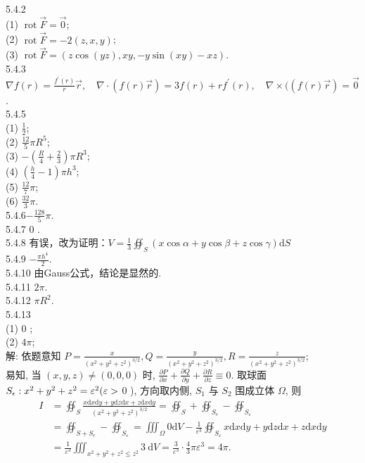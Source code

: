 \documentclass[a4paper,11pt,UTF8]{article}
\begin{document}
5.4.2\\
(1) $\operatorname{rot} \vec{F}=\overrightarrow{0}$;\\
(2) $\operatorname{rot} \vec{F}=-2(z, x, y)$;\\
(3) $\operatorname{rot} \vec{F}=(z \cos (y z), x y,-y \sin (x y)-x z)$.\\
5.4.3 $\nabla f(r)=\frac{f^{\prime}(r)}{r} \vec{r}, \quad \nabla \cdot(f(r) \vec{r})=3 f(r)+r f^{\prime}(r), \quad \nabla \times((f(r) \vec{r})=\overrightarrow{0}$.\\
5.4.5\\
(1) $\frac{1}{2}$;\\
(2) $\frac{12}{5} \pi R^5$;\\
(3) $-\left(\frac{R}{4}+\frac{2}{3}\right) \pi R^3$;\\
(4) $\left(\frac{h}{4}-1\right) \pi h^3$;\\
(5) $\frac{12}{7} \pi$;\\
(6) $\frac{32}{3} \pi$.\\
5.4.6$-\frac{128}{5} \pi$.\\
5.4.7 0 .\\
5.4.8 有误，改为证明：$V = \frac{1}{3}\oiint_S(x\cos \alpha+y \cos \beta+ z \cos \gamma)\mathrm{d}S$\\
5.4.9 $-\frac{\pi h^4}{2}$.\\
5.4.10 由Gauss公式，结论是显然的.\\
5.4.11 $ 2\pi$.\\
5.4.12 $ \pi R^2$.\\
5.4.13\\
(1) 0 ;\\
(2) $4 \pi$;\\
解: 依题意知 $P=\frac{x}{\left(x^2+y^2+z^2\right)^{3 / 2}}, Q=\frac{y}{\left(x^2+y^2+z^2\right)^{3 / 2}}, R=\frac{z}{\left(x^2+y^2+z^2\right)^{3 / 2}}$;\\
 易知, 当 $(x, y, z) \neq(0,0,0)$ 时, $\frac{\partial P}{\partial x}+\frac{\partial Q}{\partial y}+\frac{\partial R}{\partial z} \equiv 0$. 取球面 $S_\epsilon:\\ x^2+y^2+z^2=\varepsilon^2(\varepsilon>$ 0 ), 方向取内侧, $S_1$ 与 $S_2$ 围成立体 $\Omega$, 则\\
$$
\begin{aligned}
	I & =\oiint_S \frac{x \mathrm{d} x \mathrm{d} y+y \mathrm{d} z \mathrm{d} x+z \mathrm{d} x \mathrm{d} y}{\left(x^2+y^2+z^2\right)^{3 / 2}}=\oiint_S+\oiint_{S_e}-\oiint_{S_{\varepsilon}} \\
	& =\oiint_{S+S_e}-\oiint_{S_{\varepsilon}}=\iiint_{\Omega} 0 \mathrm{d} V-\frac{1}{\varepsilon^3} \oiint_{S_{\varepsilon}} x \mathrm{d}x \mathrm{d} y+y \mathrm{d} z \mathrm{d} x+z \mathrm{d} x \mathrm{d} y \\
	& =\frac{1}{\varepsilon^3} \iiint_{x^2+y^2+z^2 \leq z^2} 3 \mathrm{~d} V=\frac{3}{\varepsilon^3} \cdot \frac{4}{3} \pi \varepsilon^3=4 \pi .
\end{aligned}
$$\\
\end{document}
